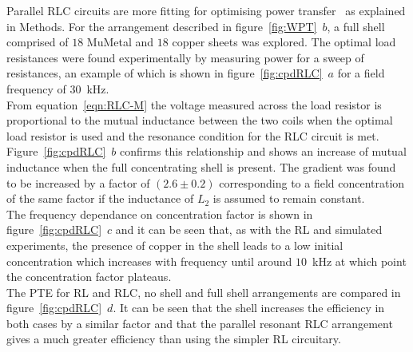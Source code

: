 \documentclass[11pt]{iopart}
\begin{document}
Parallel RLC circuits are more fitting for optimising power
transfer~\cite{XXX} as explained in Methods. For the arrangement
described in figure~\ref{fig:WPT}~$b$, a full shell comprised of $18$
MuMetal and $18$ copper sheets was explored. The optimal load
resistances were found experimentally by measuring power for a sweep
of resistances, an example of which is shown in
figure~\ref{fig:cpdRLC}~$a$ for a field frequency of $30$~kHz.\\
From equation~\ref{eqn:RLC-M} the voltage measured across the load
resistor is proportional to the mutual inductance between the two
coils when the optimal load resistor is used and the resonance
condition for the RLC circuit is met. Figure~\ref{fig:cpdRLC}~$b$
confirms this relationship and shows an increase of mutual inductance
when the full concentrating shell is present. The gradient was found
to be increased by a factor of $(2.6 \pm 0.2)$ corresponding to a field
concentration of the same factor if the inductance of $L_2$ is assumed
to remain constant. \\
The frequency dependance on concentration factor is shown in
figure~\ref{fig:cpdRLC}~$c$ and it can be seen that, as with the RL and
simulated experiments, the presence of copper in the shell leads to a
low initial concentration which increases with frequency until around
$10$~kHz at which point the concentration factor plateaus.\\
The PTE for RL and RLC, no shell and full shell arrangements are
compared in figure~\ref{fig:cpdRLC}~$d$. It can be seen that the shell
increases the efficiency in both cases by a similar factor and that
the parallel resonant RLC arrangement gives a much greater efficiency
than using the simpler RL circuitary. \\


\end{document}
